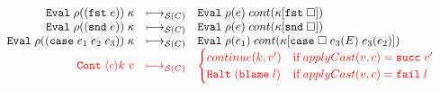 \documentclass[acmsmall,review,anonymous]{acmart}\settopmatter{printfolios=true,printccs=false,printacmref=false}
\newcommand{\sOOinspect}[3]{\mathtt{Eval} \; #2(#1) \; #3}
\newcommand{\sOOreturn}[2]{\mathtt{Cont} \; #2 \; #1}
\newcommand{\sOOhalt}[1]{\mathtt{Halt} \; #1}
\newcommand{\eOOlam}[4]{\lambda^{#1\rightarrow{}#2}#3.#4}
\newcommand{\eOOcons}[2]{\mathtt{cons} \; #1 \; #2}
\newcommand{\eOOcar}[1]{\mathtt{fst} \; #1}
\newcommand{\eOOcdr}[1]{\mathtt{snd} \; #1}
\newcommand{\eOOcase}[3]{\mathtt{case} \; #1 \; #2 \; #3}
\newcommand{\eOOcast}[4]{#1 \langle \cOOcast{#2}{#3}{#4} \rangle}
\newcommand{\cOOcast}[3]{#1 \Rightarrow^{#2} #3}
\newcommand{\oOOblame}[1]{\mathtt{blame} \; #1}
\newcommand{\rOOsucc}[1]{\mathtt{succ}\;#1}
\newcommand{\rOOfail}[1]{\mathtt{fail}\;#1}
\newcommand{\kOOconsI}[3]{#3[\mathtt{cons} \; \square \; #2(#1) ]}
\newcommand{\kOOconsII}[2]{#2[\mathtt{cons} \; #1 \; \square]}
\newcommand{\kOOinl}[1]{#1[\mathtt{inl} \; \square]}
\newcommand{\kOOinr}[1]{#1[\mathtt{inr} \; \square]}
\newcommand{\kOOappI}[3]{
	#3[\square \; #2(#1) ]
}
\newcommand{\kOOappII}[2]{
	#2[#1 \; \square]}
\newcommand{\kOOcar}[1]{#1[\mathtt{fst} \; \square]}
\newcommand{\kOOcdr}[1]{#1[\mathtt{snd} \; \square]}
\newcommand{\kOOcaseI}[4]{
	#4[\mathtt{case} \; \square \; #3(#1) \; #3(#2) ]}
\newcommand{\hcvOOfun}[5]{\mathtt{fun} \; #1 \; #2 \; #3 \; #4 \; #5}
\newcommand{\hcvOOcons}[4]{\mathtt{cons}\;#1\;#2\;#3\;#4}
\newcommand{\hcvOOinl}[2]{\mathtt{inl}\;#1\;#2}
\newcommand{\hcvOOinr}[2]{\mathtt{inr}\;#1\;#2}
\newcommand{\hckOOconsI}[3]{\mathtt{cons_1}\;#1\;#2\;#3}
\newcommand{\hckOOappII}[2]{\mathtt{app_2}\;#1\;#2}
\newcommand{\sidecond}[1]{\text{if}\;#1}
\newcommand{\redrule}[3]{#1 & \longmapsto_\mathcal{C} & #2 & #3\\}
\newcommand{\redruleS}[3]{#1 & \longmapsto_{\mathcal{S}(C)} & #2 & #3\\}
\newcommand{\hiredruleS}[3]{\highlight{#1} & 
\highlight{\longmapsto_{\mathcal{S}(C)}} & \highlight{#2} & \highlight{#3} \\}
\newcommand{\highlight}[1]{{\color{red} #1}}
\begin{document}
\begin{figure}
\[\begin{array}{rclr}
	\redruleS{
		\sOOinspect{(\eOOcar{e})}{\rho}{\kappa}}{
		\sOOinspect{e}{\rho}{cont(\kOOcar{\kappa})}}{}
	
	\redruleS{
		\sOOinspect{(\eOOcdr{e})}{\rho}{\kappa}}{
		\sOOinspect{e}{\rho}{cont(\kOOcdr{\kappa})}}{}
	
	\redruleS{
		\sOOinspect{(\eOOcase{e_1}{e_2}{e_3})}{\rho}{\kappa}}{
		\sOOinspect{e_1}{\rho}{cont(\kOOcaseI{E}{e_2}{e_3}{\kappa})}}{}
	\hiredruleS{
		\sOOreturn{v}{\langle c \rangle k}
	}{
	\begin{cases}
	continue(k,v') & \sidecond{applyCast(v,c) = \rOOsucc{v'}} 
	\\
	\sOOhalt{(\oOOblame{l})} & \sidecond{applyCast(v,c) = \rOOfail{l}}
	\end{cases}
	}{}
%
%
%
%
%
%	
%		
%		
	\end{array}
	\]
	

\end{figure}
\end{document}
